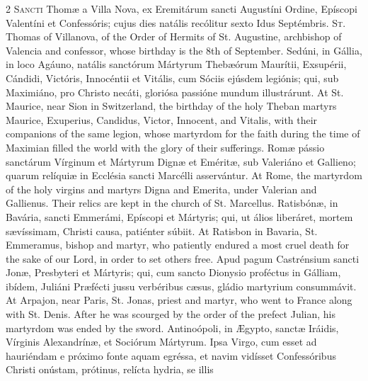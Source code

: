 \begin{paracol}{2}
\lettrine[lines=2]{S}{ancti} Thomæ a Villa 
 Nova, ex Eremitárum sancti Augustíni Ordine, Epíscopi Valentíni et 
 Confessóris; cujus dies natális recólitur sexto Idus Septémbris.
\switchcolumn
{}
\lettrine[lines=2]{S}{t.} Thomas of Villanova, of the 
 Order of Hermits of St. Augustine, archbishop of Valencia and confessor, 
 whose birthday is the 8th of September.
\switchcolumn*
{}
Sedúni, in Gállia, in 
 loco Agáuno, natális sanctórum Mártyrum Thebæórum Maurítii, Exsupérii, 
 Cándidi, Victóris, Innocéntii et Vitális, cum Sóciis ejúsdem legiónis; qui, 
 sub Maximiáno, pro Christo necáti, gloriósa passióne mundum illustrárunt.
\switchcolumn
{}
At St. Maurice, near Sion in 
 Switzerland, the birthday of the holy Theban martyrs Maurice, Exuperius, 
 Candidus, Victor, Innocent, and Vitalis, with their companions of the same 
 legion, whose martyrdom for the faith during the time of Maximian filled the 
 world with the glory of their sufferings.
\switchcolumn*
{}
Romæ pássio sanctárum 
 Vírginum et Mártyrum Dignæ et Eméritæ, sub Valeriáno et Gallieno; quarum 
 relíquiæ in Ecclésia sancti Marcélli asservántur.
\switchcolumn
{}
At Rome, the martyrdom of the holy 
 virgins and martyrs Digna and Emerita, under Valerian and Gallienus. 
 Their relics are kept in the church of St. Marcellus.
\switchcolumn*
{}
Ratisbónæ, in Bavária, sancti Emmerámi, Epíscopi et Mártyris; qui, ut álios liberáret, mortem 
 sævíssimam, Christi causa, patiénter súbiit.
\switchcolumn
{}
At Ratisbon in Bavaria, St. 
 Emmeramus, bishop and martyr, who patiently endured a most cruel death for 
 the sake of our Lord, in order to set others free.
\switchcolumn*
{}
Apud pagum Castrénsium 
 sancti Jonæ, Presbyteri et Mártyris; qui, cum sancto Dionysio proféctus in 
 Gálliam, ibídem, Juliáni Præfécti jussu verbéribus cæsus, gládio martyrium 
 consummávit.
\switchcolumn
{}
At Arpajon, near Paris, St. Jonas, 
 priest and martyr, who went to France along with St. Denis. After he 
 was scourged by the order of the prefect Julian, his martyrdom was ended by 
 the sword.
\switchcolumn*
{}
Antinoópoli, in Ægypto, 
 sanctæ Iráidis, Vírginis Alexandrínæ, et Sociórum Mártyrum. Ipsa 
 Virgo, cum esset ad hauriéndam e próximo fonte aquam egréssa, et navim 
 vidísset Confessóribus Christi onústam, prótinus, relícta hydria, se illis 

\end{paracol}
